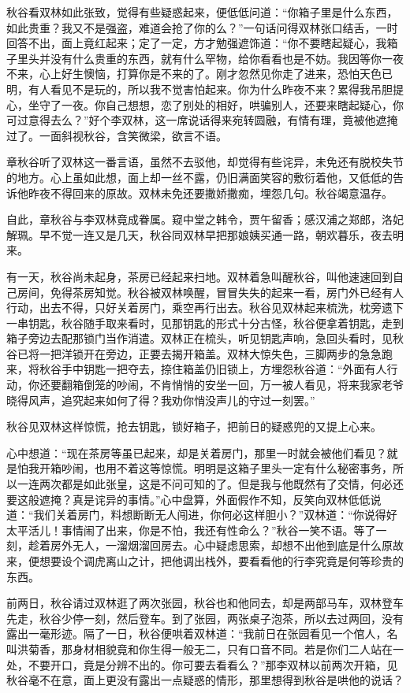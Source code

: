 \documentclass[12pt,UTF8]{ctexbook}
\begin{document}
{{{秋谷看双林如此张致，觉得有些疑惑起来，便低低问道：“你箱子里是什么东西，如此贵重？我又不是强盗，难道会抢了你的么？”一句话问得双林张口结舌，一时回答不出，面上竟红起来；定了一定，方才勉强遮饰道：“你不要瞎起疑心，我箱子里头并没有什么贵重的东西，就有什么罕物，给你看看也是不妨。我因等你一夜不来，心上好生懊恼，打算你是不来的了。刚才忽然见你走了进来，恐怕天色已明，有人看见不是玩的，所以我不觉害怕起来。你为什么昨夜不来？累得我吊胆提心，坐守了一夜。你自己想想，恋了别处的相好，哄骗别人，还要来瞎起疑心，你可过意得去么？”好个李双林，这一席说话得来宛转圆融，有情有理，竟被他遮掩过了。一面斜视秋谷，含笑微梁，欲言不语。

章秋谷听了双林这一番言语，虽然不去驳他，却觉得有些诧异，未免还有脱校失节的地方。心上虽如此想，面上却一丝不露，仍旧满面笑容的敷衍着他，又低低的告诉他昨夜不得回来的原故。双林未免还要撒娇撒痴，埋怨几句。秋谷竭意温存。

自此，章秋谷与李双林竟成眷属。窥中堂之韩令，贾午留香；感汉浦之郑郎，洛妃解珮。早不觉一连又是几天，秋谷同双林早把那娘姨买通一路，朝欢暮乐，夜去明来。

有一天，秋谷尚未起身，茶房已经起来扫地。双林着急叫醒秋谷，叫他速速回到自己房间，免得茶房知觉。秋谷被双林唤醒，冒冒失失的起来一看，房门外已经有人行动，出去不得，只好关着房门，乘空再行出去。秋谷见双林起来梳洗，枕旁遗下一串钥匙，秋谷随手取来看时，见那钥匙的形式十分古怪，秋谷便拿着钥匙，走到箱子旁边去配那锁门当作消遣。双林正在梳头，听见钥匙声响，急回头看时，见秋谷已将一把洋锁开在旁边，正要去揭开箱盖。双林大惊失色，三脚两步的急急跑来，将秋谷手中钥匙一把夺去，捺住箱盖仍旧锁上，方埋怨秋谷道：“外面有人行动，你还要翻箱倒笼的吵闹，不肯悄悄的安坐一回，万一被人看见，将来我家老爷晓得风声，追究起来如何了得？我劝你悄没声儿的守过一刻罢。”

秋谷见双林这样惊慌，抢去钥匙，锁好箱子，把前日的疑惑兜的又提上心来。

心中想道：“现在茶房等虽已起来，却是关着房门，那里一时就会被他们看见？就是怕我开箱吵闹，也用不着这等惊慌。明明是这箱子里头一定有什么秘密事务，所以一连两次都是如此张皇，这是不问可知的了。但是我与他既然有了交情，何必还要这般遮掩？真是诧异的事情。”心中盘算，外面假作不知，反笑向双林低低说道：“我们关着房门，料想断断无人闯进，你何必这样胆小？”双林道：“你说得好太平活儿！事情闹了出来，你是不怕，我还有性命么？”秋谷一笑不语。等了一刻，趁着房外无人，一溜烟溜回房去。心中疑虑思索，却想不出他到底是什么原故来，便想要设个调虎离山之计，把他调出栈外，要看看他的行李究竟是何等珍贵的东西。

前两日，秋谷请过双林逛了两次张园，秋谷也和他同去，却是两部马车，双林登车先走，秋谷少停一刻，然后登车。到了张园，两张桌子泡茶，所以去过两回，没有露出一毫形迹。隔了一日，秋谷便哄着双林道：“我前日在张园看见一个倌人，名叫洪菊香，那身材相貌竟和你生得一般无二，只有口音不同。若是你们二人站在一处，不要开口，竟是分辨不出的。你可要去看看么？”那李双林以前两次开箱，见秋谷毫不在意，面上更没有露出一点疑惑的情形，那里想得到秋谷是哄他的说话？

}}}
\end{document}
